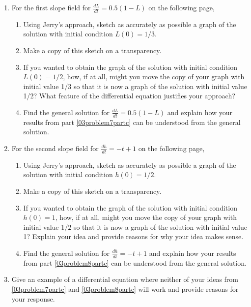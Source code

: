 \begin{enumerate}[resume]
\item For the first slope field for $\frac{dL}{dt} = 0.5(1 - L)$ on the following page,\label{03problem7}
\begin{enumerate}

\item	Using Jerry's approach, sketch as accurately as possible a graph of the solution with initial condition $L(0) = 1/3$. \label{03problem7parta}
\item	Make a copy of this sketch on a transparency. \label{03problem7partb}
\item	If you wanted to obtain the graph of the solution with initial condition $L(0) = 1/2$, how, if at all, might you move the copy of your graph with initial value 1/3 so that it is now a graph of the solution with initial value 1/2? What feature of the differential equation justifies your approach? \label{03problem7partc}
\item	Find the general solution for $\displaystyle\frac{dL}{dt}= 0.5(1-L)$ and explain how your results from part \ref{03problem7partc} can be understood from the general solution.\label{03problem7partd}
\vfill	

\end{enumerate}
\item	For the second slope field for $\frac{dh}{dt} = -t + 1$ on the following page,\label{03problem8}
\begin{enumerate}
\item	Using Jerry's approach, sketch as accurately as possible a graph of the solution with initial condition $h(0) = 1/2$. \label{03problem8parta}
\item	Make a copy of this sketch on a transparency. \label{03problem8partb}
\item	If you wanted to obtain the graph of the solution with initial condition $h(0) = 1$, how, if at all, might you move the copy of your graph with initial value $1/2$ so that it is now a graph of the solution with initial value 1? Explain your idea and provide reasons for why your idea makes sense. \label{03problem8partc}
\item	Find the general solution for $\frac{dh}{dt} = -t + 1$ and explain how your results from part \ref{03problem8partc} can be understood from the general solution. \label{03problem8partd} \vfill
\end{enumerate}

\item  Give an example of a differential equation where neither of your ideas from \ref{03problem7partc} and \ref{03problem8partc} will work and provide reasons for your response.\label{03problem9}\vfill
\end{enumerate}

